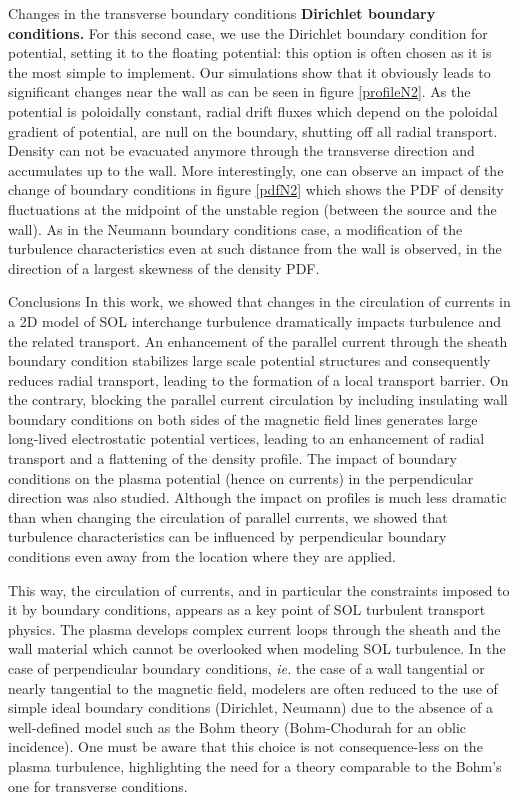 \documentclass[a4paper,12pt]{article} %
\begin{document}
\begin{section}{Changes in the transverse boundary conditions}
\textbf{Dirichlet boundary conditions.} For this second case, we use the Dirichlet boundary condition 
for potential, setting it to the floating potential: this option is often chosen as it is the most simple to implement. 
Our simulations show that it obviously leads to significant changes near the wall as can be seen in figure \ref{profileN2}. 
As the potential is poloidally constant, radial drift fluxes which depend on the poloidal gradient of potential,
are null on the boundary, shutting off all radial transport. 
Density can not be evacuated anymore through the transverse direction and accumulates up to the wall.
More interestingly, one can observe an impact of the change of boundary conditions in figure \ref{pdfN2} 
which shows the PDF of density fluctuations at the midpoint of the unstable region (between the source and the wall). 
As in the Neumann boundary conditions case, a modification of the turbulence characteristics even at such distance 
from the wall is observed, in the direction of a largest skewness of the density PDF. 
\end{section}

\begin{section}{Conclusions} 
In this work, we showed that changes in the circulation of currents in a 2D model of SOL interchange turbulence 
dramatically impacts turbulence and the related transport. An enhancement of the parallel current through the 
sheath boundary condition stabilizes large scale potential structures and consequently reduces radial transport, 
leading to the formation of a local transport barrier. On the contrary, blocking the parallel current circulation by
including insulating wall boundary conditions on both sides of the magnetic field lines generates large long-lived
electrostatic potential vertices, leading to an enhancement of radial transport and a flattening of the density profile. 
The impact of boundary conditions on the plasma potential (hence on currents) in the perpendicular direction was 
also studied. Although the impact on profiles is much less dramatic than when changing the circulation of parallel 
currents, we showed that turbulence characteristics can be influenced by perpendicular boundary conditions even away 
from the location where they are applied.

This way, the circulation of currents, and in particular the constraints imposed to it by boundary conditions, appears as 
a key point of SOL turbulent transport physics. The plasma develops complex current loops through the sheath and the 
wall material which cannot be overlooked when modeling SOL turbulence. In the case of perpendicular boundary conditions, 
\emph{ie.} the case of a wall tangential or nearly tangential to the magnetic field, modelers are often reduced to 
the use of simple ideal boundary conditions (Dirichlet, Neumann) due to the absence of a well-defined model such as the 
Bohm theory (Bohm-Chodurah for an oblic incidence). One must be aware that this choice is not consequence-less on the 
plasma turbulence, highlighting the need for a theory comparable to the Bohm's one for transverse conditions.
\end{section}
\end{document}

